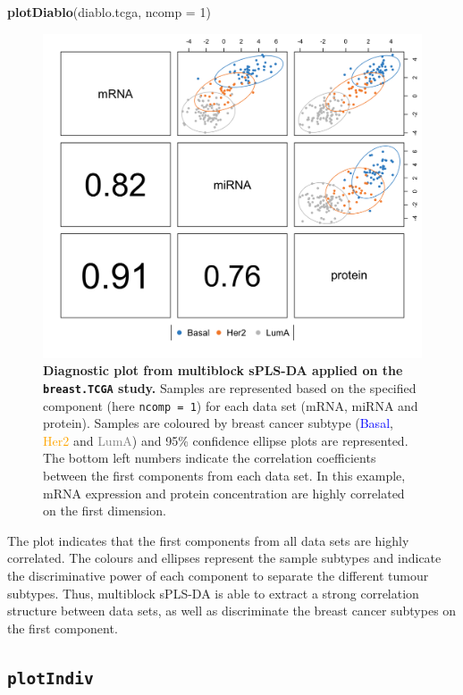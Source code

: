 \documentclass[]{book}
\newenvironment{Shaded}{\begin{snugshade}}{\end{snugshade}}
\newcommand{\KeywordTok}[1]{\textcolor[rgb]{0.13,0.29,0.53}{\textbf{#1}}}
\newcommand{\DataTypeTok}[1]{\textcolor[rgb]{0.13,0.29,0.53}{#1}}
\newcommand{\DecValTok}[1]{\textcolor[rgb]{0.00,0.00,0.81}{#1}}
\newcommand{\NormalTok}[1]{#1}
\begin{document}
\begin{Shaded}
\begin{Highlighting}[]
\KeywordTok{plotDiablo}\NormalTok{(diablo.tcga, }\DataTypeTok{ncomp =} \DecValTok{1}\NormalTok{)}
\end{Highlighting}
\end{Shaded}

\begin{figure}

{\centering \includegraphics[width=0.5\linewidth]{Figures/DIABLO/plot-diablo-1} 

}

\caption{\textbf{Diagnostic plot from multiblock sPLS-DA
applied on the \texttt{breast.TCGA} study.} Samples are represented
based on the specified component (here \texttt{ncomp\ =\ 1}) for each
data set (mRNA, miRNA and protein). Samples are coloured by breast
cancer subtype (\textcolor{blue}{Basal}, \textcolor{orange}{Her2} and
\textcolor{grey}{LumA}) and 95\% confidence ellipse plots are
represented. The bottom left numbers indicate the correlation
coefficients between the first components from each data set. In this
example, mRNA expression and protein concentration are highly correlated
on the first dimension.}\label{fig:plot-diablo}
\end{figure}












The plot indicates that the first components from all data sets are
highly correlated. The colours and ellipses represent the sample
subtypes and indicate the discriminative power of each component to
separate the different tumour subtypes. Thus, multiblock sPLS-DA is able
to extract a strong correlation structure between data sets, as well as
discriminate the breast cancer subtypes on the first component.

\subsection{\texorpdfstring{\texttt{plotIndiv}}{plotIndiv}}\label{plotindiv}
\end{document}
